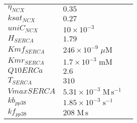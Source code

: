 \documentclass[a4paper,10.0pt]{article}
\begin{document}
{\begin{longtabu}{| l l l |}
  $\eta_{NCX}$\hspace{0.5cm} & $0.35$\hspace{0.5cm} & \hspace{0.5cm}\\
  $ksat_{NCX}$\hspace{0.5cm} & $0.27$\hspace{0.5cm} & \hspace{0.5cm}\\
  $uniC_{NCX}$\hspace{0.5cm} & $10\!\times\!10 ^{-3}$\hspace{0.5cm} & \hspace{0.5cm}\\
  $H_{SERCA}$\hspace{0.5cm} & $1.79$\hspace{0.5cm} & \hspace{0.5cm}\\
  $Kmf_{SERCA}$\hspace{0.5cm} & $246\!\times\!10 ^{-9}\;\mu\mathrm{M}$\hspace{0.5cm} & \hspace{0.5cm}\\
  $Kmr_{SERCA}$\hspace{0.5cm} & $1.7\!\times\!10 ^{-3}\;\mathrm{mM}$\hspace{0.5cm} & \hspace{0.5cm}\\
  $Q10ERCa$\hspace{0.5cm} & $2.6$\hspace{0.5cm} & \hspace{0.5cm}\\
  $T_{SERCA}$\hspace{0.5cm} & $310$\hspace{0.5cm} & \hspace{0.5cm}\\
  $VmaxSERCA$\hspace{0.5cm} & $5.31\!\times\!10 ^{-3}\;\mathrm{M}\,\mathrm{s}^{-1}$\hspace{0.5cm} & \hspace{0.5cm}\\
  $kb_{pp38}$\hspace{0.5cm} & $1.85\!\times\!10 ^{-3}\;\mathrm{s}^{-1}$\hspace{0.5cm} & \hspace{0.5cm}\\
  $kf_{pp38}$\hspace{0.5cm} & $208\;\mathrm{M}\,\mathrm{s}$\hspace{0.5cm} & \hspace{0.5cm}\\

\end{longtabu}}
\end{document}
